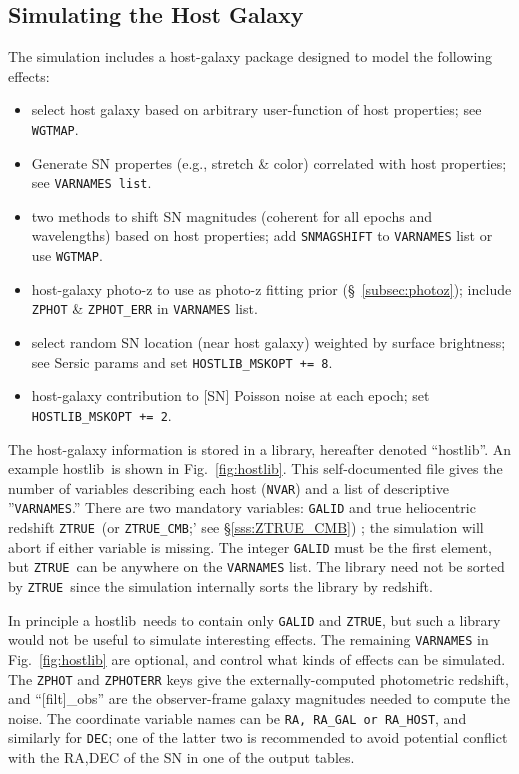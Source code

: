 \documentclass[12pt]{article}
\newcommand{\hostlib}{{\sc hostlib}}
\newcommand{\ztrue}{{\tt ZTRUE}}
\begin{document}
{%
\clearpage
\subsection{Simulating the Host Galaxy}
\label{subsec:hostlib}

The simulation includes a host-galaxy
package designed to model the following effects:
\begin{itemize}
%
  \item select host galaxy based on arbitrary user-function
        of host properties; see {\tt WGTMAP}.
%
  \item Generate SN propertes (e.g., stretch \& color) correlated
        with host properties; see {\tt VARNAMES list}.
%
  \item two methods to shift SN magnitudes 
        (coherent for all epochs and wavelengths) 
        based on host properties;
	add {\tt SNMAGSHIFT} to  {\tt VARNAMES} list or use {\tt WGTMAP}.
%
  \item host-galaxy photo-z to use as photo-z fitting prior 
    (\S~\ref{subsec:photoz});
    include {\tt ZPHOT} \& {\tt ZPHOT\_ERR} in {\tt VARNAMES} list.	
%
  \item select random SN location (near host galaxy)
    weighted by surface brightness; see Sersic params
    and set {\tt HOSTLIB\_MSKOPT += 8}.
%
  \item host-galaxy contribution to [SN] Poisson noise at each epoch;
    set {\tt HOSTLIB\_MSKOPT += 2}.
%
\end{itemize} 

The host-galaxy information is stored in a library,
hereafter denoted ``{\hostlib}''. An example \hostlib\
is shown in Fig.~\ref{fig:hostlib}.
This self-documented file gives the number of variables
describing each host ({\tt NVAR}) and a list of 
descriptive ''{\tt VARNAMES}.''  
There are two mandatory variables: {\tt GALID} and 
true heliocentric redshift \ztrue\ 
(or {\tt ZTRUE\_CMB};' see \S\ref{sss:ZTRUE_CMB}) ; 
the simulation will abort if either variable is missing. 
The integer {\tt GALID} must be the first element,
but \ztrue\ can be anywhere on the {\tt VARNAMES} list.
The library need not be sorted by \ztrue\ since
the simulation internally sorts the library by redshift.

In principle a \hostlib\ needs to contain only
{\tt GALID} and \ztrue, but such a library would
not be useful to simulate interesting effects.
The remaining {\tt VARNAMES} in Fig.~\ref{fig:hostlib}
are optional, and control what kinds of effects can
be simulated.  The {\tt ZPHOT} and {\tt ZPHOTERR} keys
give the externally-computed photometric redshift,
and ``[filt]\_obs'' are the observer-frame galaxy
magnitudes needed to compute the noise.
The coordinate variable names can be {\tt RA, RA\_GAL or RA\_HOST},
and similarly for {\tt DEC}; one of the latter two is recommended
to avoid potential conflict with the RA,DEC of the SN in one of the
output tables.

}
\end{document}
